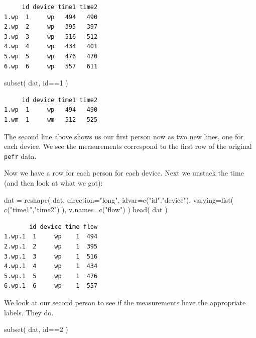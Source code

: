 \documentclass[
  letterpaper,
  DIV=11,
  numbers=noendperiod]{scrreprt}
\newenvironment{Shaded}{\begin{snugshade}}{\end{snugshade}}
\newcommand{\AttributeTok}[1]{\textcolor[rgb]{0.49,0.56,0.16}{#1}}
\newcommand{\DecValTok}[1]{\textcolor[rgb]{0.25,0.63,0.44}{#1}}
\newcommand{\FunctionTok}[1]{\textcolor[rgb]{0.02,0.16,0.49}{#1}}
\newcommand{\NormalTok}[1]{\textcolor[rgb]{0.00,0.44,0.13}{#1}}
\newcommand{\OtherTok}[1]{\textcolor[rgb]{0.00,0.44,0.13}{#1}}
\newcommand{\SpecialCharTok}[1]{\textcolor[rgb]{0.25,0.44,0.63}{#1}}
\newcommand{\StringTok}[1]{\textcolor[rgb]{0.25,0.44,0.63}{#1}}
\begin{document}
\begin{verbatim}
     id device time1 time2
1.wp  1     wp   494   490
2.wp  2     wp   395   397
3.wp  3     wp   516   512
4.wp  4     wp   434   401
5.wp  5     wp   476   470
6.wp  6     wp   557   611
\end{verbatim}

\begin{Shaded}
\begin{Highlighting}[]
\FunctionTok{subset}\NormalTok{( dat, id}\SpecialCharTok{==}\DecValTok{1}\NormalTok{ )}
\end{Highlighting}
\end{Shaded}

\begin{verbatim}
     id device time1 time2
1.wp  1     wp   494   490
1.wm  1     wm   512   525
\end{verbatim}

The second line above shows us our first person now as two new lines,
one for each device. We see the measurements correspond to the first row
of the original \texttt{pefr} data.

Now we have a row for each person for each device. Next we unstack the
time (and then look at what we got):

\begin{Shaded}
\begin{Highlighting}[]
\NormalTok{dat }\OtherTok{=} \FunctionTok{reshape}\NormalTok{( dat, }\AttributeTok{direction=}\StringTok{"long"}\NormalTok{, }\AttributeTok{idvar=}\FunctionTok{c}\NormalTok{(}\StringTok{"id"}\NormalTok{,}\StringTok{"device"}\NormalTok{),}
               \AttributeTok{varying=}\FunctionTok{list}\NormalTok{( }\FunctionTok{c}\NormalTok{(}\StringTok{"time1"}\NormalTok{,}\StringTok{"time2"}\NormalTok{) ),}
               \AttributeTok{v.names=}\FunctionTok{c}\NormalTok{(}\StringTok{"flow"}\NormalTok{) )}
\FunctionTok{head}\NormalTok{( dat )}
\end{Highlighting}
\end{Shaded}

\begin{verbatim}
       id device time flow
1.wp.1  1     wp    1  494
2.wp.1  2     wp    1  395
3.wp.1  3     wp    1  516
4.wp.1  4     wp    1  434
5.wp.1  5     wp    1  476
6.wp.1  6     wp    1  557
\end{verbatim}

We look at our second person to see if the measurements have the
appropriate labels. They do.

\begin{Shaded}
\begin{Highlighting}[]
\FunctionTok{subset}\NormalTok{( dat, id}\SpecialCharTok{==}\DecValTok{2}\NormalTok{ )}
\end{Highlighting}
\end{Shaded}
\end{document}
